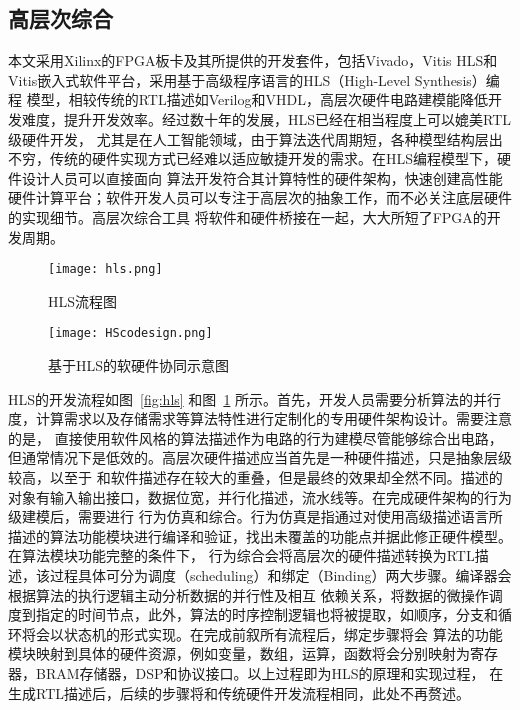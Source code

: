 \subsection{高层次综合}
本文采用Xilinx的FPGA板卡及其所提供的开发套件，包括Vivado，Vitis HLS和Vitis嵌入式软件平台，采用基于高级程序语言的HLS（High-Level Synthesis）编程
模型，相较传统的RTL描述如Verilog和VHDL，高层次硬件电路建模能降低开发难度，提升开发效率。经过数十年的发展，HLS已经在相当程度上可以媲美RTL级硬件开发，
尤其是在人工智能领域，由于算法迭代周期短，各种模型结构层出不穷，传统的硬件实现方式已经难以适应敏捷开发的需求。在HLS编程模型下，硬件设计人员可以直接面向
算法开发符合其计算特性的硬件架构，快速创建高性能硬件计算平台；软件开发人员可以专注于高层次的抽象工作，而不必关注底层硬件的实现细节。高层次综合工具
将软件和硬件桥接在一起，大大所短了FPGA的开发周期。
\begin{figure}
	\centering
	\begin{minipage}[t]{0.48\textwidth}
		\centering
		\texttt{[image: hls.png]}
		\caption{HLS流程图}
		\label{fig:hls}
	\end{minipage}
	\begin{minipage}[t]{0.48\textwidth}
		\centering
		\texttt{[image: HScodesign.png]}
		\caption{基于HLS的软硬件协同示意图}
		\label{fig:hlscodesign}
	\end{minipage}
\end{figure}

HLS的开发流程如图~\ref{fig:hls} 和图~\ref{fig:hlscodesign} 所示。首先，开发人员需要分析算法的并行度，计算需求以及存储需求等算法特性进行定制化的专用硬件架构设计。需要注意的是，
直接使用软件风格的算法描述作为电路的行为建模尽管能够综合出电路，但通常情况下是低效的。高层次硬件描述应当首先是一种硬件描述，只是抽象层级较高，以至于
和软件描述存在较大的重叠，但是最终的效果却全然不同。描述的对象有输入输出接口，数据位宽，并行化描述，流水线等。在完成硬件架构的行为级建模后，需要进行
行为仿真和综合。行为仿真是指通过对使用高级描述语言所描述的算法功能模块进行编译和验证，找出未覆盖的功能点并据此修正硬件模型。在算法模块功能完整的条件下，
行为综合会将高层次的硬件描述转换为RTL描述，该过程具体可分为调度（scheduling）和绑定（Binding）两大步骤。编译器会根据算法的执行逻辑主动分析数据的并行性及相互
依赖关系，将数据的微操作调度到指定的时间节点，此外，算法的时序控制逻辑也将被提取，如顺序，分支和循环将会以状态机的形式实现。在完成前叙所有流程后，绑定步骤将会
算法的功能模块映射到具体的硬件资源，例如变量，数组，运算，函数将会分别映射为寄存器，BRAM存储器，DSP和协议接口。以上过程即为HLS的原理和实现过程，
在生成RTL描述后，后续的步骤将和传统硬件开发流程相同，此处不再赘述。


